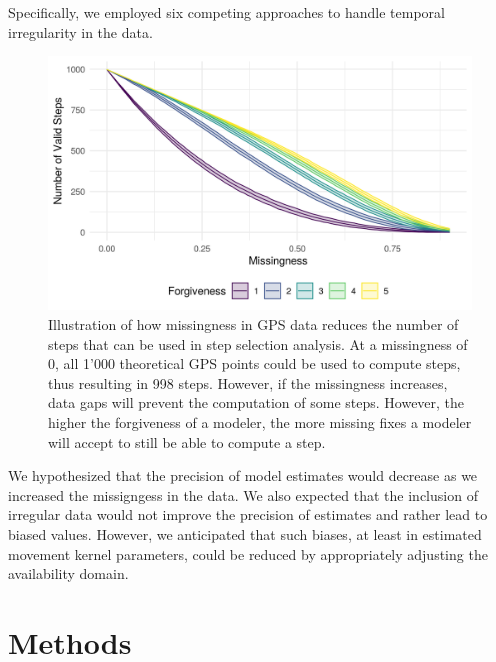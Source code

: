 \documentclass[abstract=on,10pt,a4paper,bibliography=totocnumbered]{article}
\begin{document}
Specifically, we employed six competing approaches to handle temporal
irregularity in the data.

\begin{figure}
  \begin{center}
  \includegraphics[width = \textwidth]{99_NumberOfSteps.png}
  \caption{Illustration of how missingness in GPS data reduces the number of
  steps that can be used in step selection analysis. At a missingness of 0, all
  1'000 theoretical GPS points could be used to compute steps, thus resulting in
  998 steps. However, if the missingness increases, data gaps will prevent the
  computation of some steps. However, the higher the forgiveness of a modeler,
  the more missing fixes a modeler will accept to still be able to compute a
  step.}
  \label{ValidSteps}
  \end{center}
\end{figure}

We hypothesized that the precision of model estimates would decrease as we
increased the missigngess in the data. We also expected that the inclusion of
irregular data would not improve the precision of estimates and rather lead to
biased values. However, we anticipated that such biases, at least in estimated
movement kernel parameters, could be reduced by appropriately adjusting the
availability domain.

\section{Methods}
\end{document}
